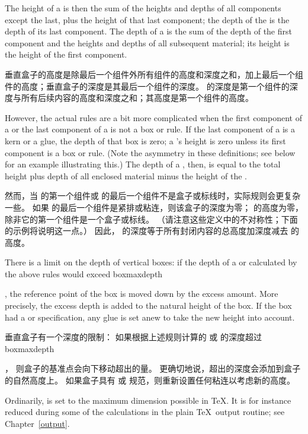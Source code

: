 The height of a  is then the sum of the heights and
depths of all components except the last, plus the height
of that last component; the depth of the  is the
depth of its last component.
The depth of a 
is the sum of the depth of the first component and the heights
and depths of all subsequent material; its height is the
height of the first component.

垂直盒子的高度是除最后一个组件外所有组件的高度和深度之和，加上最后一个组件的高度；垂直盒子的深度是其最后一个组件的深度。
 的深度是第一个组件的深度与所有后续内容的高度和深度之和；其高度是第一个组件的高度。

However, the actual rules are a bit
more complicated when the first component of a 
or the last component of a  is not a box or rule.
If the last component of a  is a kern or a glue,
the depth of that box is zero; a 's 
height is zero
unless its first component is a box or rule.
\altt
(Note the asymmetry in these definitions; see below for
an example illustrating this.)
The depth of a , then, is equal to the total
height plus depth of all enclosed material minus
the height of the .

然而，当  的第一个组件或  的最后一个组件不是盒子或标线时，实际规则会更复杂一些。
如果  的最后一个组件是紧排或粘连，则该盒子的深度为零； 的高度为零，除非它的第一个组件是一个盒子或标线。
（请注意这些定义中的不对称性；下面的示例将说明这一点。）
因此， 的深度等于所有封闭内容的总高度加深度减去  的高度。

There is a limit on the depth of vertical boxes:
if the depth of a  or 
calculated by the above rules would exceed
\cstoidx boxmaxdepth\par,
the reference point of the box
is moved down by the excess amount. 
More precisely, the excess depth is added to the 
natural height of the box. If the box had a  or
 specification, any glue is set anew to take
the new height into account.

垂直盒子有一个深度的限制：
如果根据上述规则计算的  或  的深度超过 \cstoidx boxmaxdepth\par，
则盒子的基准点会向下移动超出的量。
更确切地说，超出的深度会添加到盒子的自然高度上。
如果盒子具有  或  规范，则重新设置任何粘连以考虑新的高度。

Ordinarily,
 is set to the maximum dimension
possible in \TeX. It is for instance reduced during some of
the calculations  in the plain \TeX\ output routine;
see Chapter~\ref{output}.

